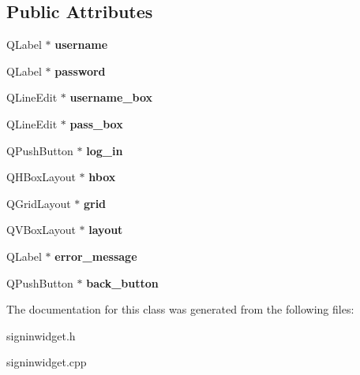 \subsection*{Public Attributes}
\begin{DoxyCompactItemize}
\item 
\mbox{\label{classSignInWidget_aa8aa08d2074b88a76c27a4a8d2cb30aa}} 
Q\+Label $\ast$ {\bfseries username}
\item 
\mbox{\label{classSignInWidget_aecae7b246e3e4b8ee92d7766fcd2cbb4}} 
Q\+Label $\ast$ {\bfseries password}
\item 
\mbox{\label{classSignInWidget_a285d85bf5a50682092ebeae4b649a6bf}} 
Q\+Line\+Edit $\ast$ {\bfseries username\+\_\+box}
\item 
\mbox{\label{classSignInWidget_a9d7aea24e354e02199cd291b315468d9}} 
Q\+Line\+Edit $\ast$ {\bfseries pass\+\_\+box}
\item 
\mbox{\label{classSignInWidget_adee8b382dec358f91247e645088a31c4}} 
Q\+Push\+Button $\ast$ {\bfseries log\+\_\+in}
\item 
\mbox{\label{classSignInWidget_ac4e539c190d9286fac1c7f13e3f22221}} 
Q\+H\+Box\+Layout $\ast$ {\bfseries hbox}
\item 
\mbox{\label{classSignInWidget_a9431b22556c5dde79aa7bb709e3668e9}} 
Q\+Grid\+Layout $\ast$ {\bfseries grid}
\item 
\mbox{\label{classSignInWidget_aa644ac4a70d186c4dccbc9c0d4d95119}} 
Q\+V\+Box\+Layout $\ast$ {\bfseries layout}
\item 
\mbox{\label{classSignInWidget_abaae0b61c094b30dce2b717cce615a6d}} 
Q\+Label $\ast$ {\bfseries error\+\_\+message}
\item 
\mbox{\label{classSignInWidget_a22d3a8059947b3354c39dde4206d9cf4}} 
Q\+Push\+Button $\ast$ {\bfseries back\+\_\+button}
\end{DoxyCompactItemize}


The documentation for this class was generated from the following files\+:\begin{DoxyCompactItemize}
\item 
signinwidget.\+h\item 
signinwidget.\+cpp\end{DoxyCompactItemize}
